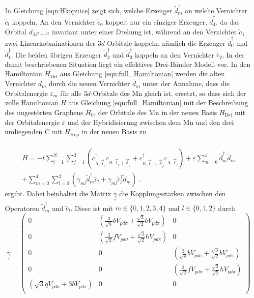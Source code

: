 In Gleichung \eqref{eqn:Hkopnice} zeigt sich, welche Erzeuger $\tilde{d}_m^{\dagger}$ an welche Vernichter $\tilde{c}_l$ koppeln.
An den Vernichter $\tilde{c}_{0}$ koppelt nur ein einziger Erzeuger, $\tilde{d}_{4}^{\dagger}$, da das Orbital $d_{3z^2-r^2}$ invariant unter einer Drehung ist,
während an den Vernichter $\tilde{c}_{1}$ zwei Linearkobminationen der $3d$-Orbitale koppeln, nämlich 
die Erzeuger $\tilde{d}_{0}^{\dagger}$ und $\tilde{d}_{1}^{\dagger}$. 
Die beiden übrigen Erzeuger $\tilde{d}_{2}^{\dagger}$ und $\tilde{d}_{3}^{\dagger}$ koppeln an den Vernichter  $\tilde{c}_{2}$.
In der damit beschriebenen Situation liegt ein effektives Drei-Bänder Modell vor.
In den Hamiltonian $H_\text{Def}$ aus Gleichung \eqref{eqn:full_Hamiltonian} werden die alten Vernichter $d_m$ durch die neuen Vernichter $\tilde{d}_m$ unter 
der Annahme, dass die Orbitalenergie $\varepsilon_m$ für alle $3d$-Orbitale des Mn gleich ist, ersetzt, so dass sich der volle Hamiltonian $H$
aus Gleichung \eqref{eqn:full_Hamiltonian} mit der Beschreibung des ungestörten Graphens $H_0$, 
der Orbitale des Mn in der neuen Basis $H_{\text{Def}}$ mit der Orbitalenergie $\varepsilon$ und
der Hybridisierung zwischen dem Mn und den drei umliegenden C mit $H_\text{Kop}$ in der neuen Basis zu\\
\\
\begin{multline}
    H = -t\sum_{i=1}^N \sum_{j=1}^3 \left ( c_{\text{A},\vec{l}_i}^\dagger c_{\text{B},\vec{l}_i+\vec{\delta}_j} + 
    c_{\text{B},\vec{l}_i+\vec{\delta}_j}^\dagger c_{\text{A},\vec{l}_i} \right ) + \varepsilon \sum_{m=0}^4 \tilde{d}^\dagger_m \tilde{d}_m \\
    +\sum_{m=0}^4\sum_{l=0}^2(\gamma_{ml} \tilde{d}^\dagger_m \tilde{c}_l + \gamma_{ml} \tilde{c}^\dagger_l \tilde{d}_m) \; .
\end{multline}
ergibt.
Dabei beinhaltet die Matrix $\underline{\underline{\gamma}}$ die Kopplungsstärken zwischen den Operatoren $\tilde{d}_m^\dagger$ und $\tilde{c}_l$.
Diese ist mit $m \in \{ 0,1,2,3,4 \}$ und $l \in \{ 0,1,2 \}$ durch
\begin{equation*}
     \underline{\underline{\gamma}} = 
    \begin{pmatrix}
        0               & \left ( \frac{3}{\sqrt{8}} b V_{pd\sigma} + \frac{\sqrt{3}}{\sqrt{2}}  b   V_{pd\pi} \right )    &   0           \\
        0               & \left ( \frac{3}{\sqrt{2}} f V_{pd\sigma} + \frac{\sqrt{3}}{\sqrt{2}}  h   V_{pd\pi} \right )   &   0           \\
        0               & 0             &   \left ( \frac{3}{\sqrt{8}} b V_{pd\sigma} + \frac{\sqrt{3}}{\sqrt{2}}  b   V_{pd\pi} \right ) \\
        0               & 0             &   \left ( \frac{3}{\sqrt{2}} f V_{pd\sigma} + \frac{\sqrt{3}}{\sqrt{2}}  h   V_{pd\pi} \right ) \\
        \left (  \sqrt{3} q V_{pd\sigma} + 3 b V_{pd\pi} \right )     & 0             &   0           \\
    \end{pmatrix}
\end{equation*} 
